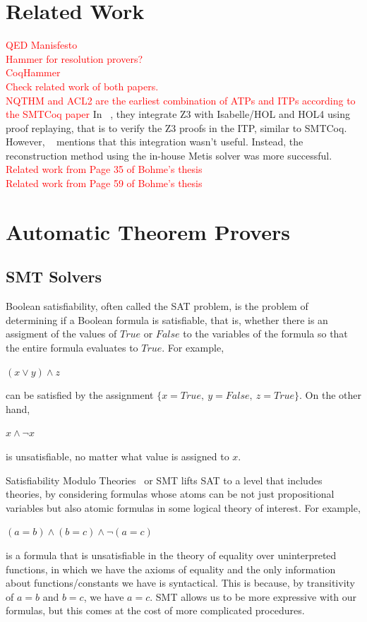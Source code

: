 \documentclass{article}
\begin{document}
\section{Related Work}
\label{sec:rel}
	\textcolor{red}{QED Manisfesto}\\
	\textcolor{red}{Hammer for resolution provers?}\\
	\textcolor{red}{CoqHammer}\\
	\textcolor{red}{Check related work of both papers.}\\
	\textcolor{red}{NQTHM and ACL2 are the earliest combination of ATPs and ITPs according to the SMTCoq paper}
	In ~\cite{10.1007/978-3-642-14052-5_14}, they integrate 
	Z3 with Isabelle/HOL and HOL4 
	using proof replaying, that is to verify 
	the Z3 proofs in the ITP, similar to SMTCoq. However, 
	~\cite{10.1007/978-3-642-22438-6_11} mentions that this
	integration wasn't useful. Instead, the reconstruction 
	method using the in-house Metis solver was more 
	successful. \\
	\textcolor{red}{Related work from Page 35 of Bohme's thesis}\\
	\textcolor{red}{Related work from Page 59 of Bohme's thesis}\\
	
\section{Automatic Theorem Provers}
\label{sec:atp}	
\subsection{SMT Solvers}
\label{smt}
	Boolean satisfiability, often called the SAT problem, 
	is the problem of determining if a Boolean formula
	is satisfiable, that is, whether there is an 
	assigment of the values of $True$ or $False$ 
	to the variables of the formula so that the entire 
	formula evaluates to $True$.
	For example,
	\begin{center}$(x \lor y) \land z$ \end{center}
	can be satisfied by the 
	assignment $\{x=True,\ y=False,\ z=True\}$. On the other hand, 
	\begin{center} $x \land \neg x$ \end{center}
	is unsatisfiable, no matter what value is assigned to $x$.
	
	Satisfiability Modulo Theories~\cite{DBLP:reference/mc/BarrettT18} 
	or SMT lifts SAT to a level that includes theories,
	by considering formulas whose atoms can be not just propositional variables but also atomic formulas in 
	some logical theory of interest.
	For example, 
	\begin{center} $(a = b) \land (b = c) \land \neg (a = c)$ 
	\end{center}
	is a formula that is unsatisfiable in the theory of 
	equality over uninterpreted functions, in which we have 
	the axioms of equality and the only information about
	functions/constants we have is syntactical. 
	This is because, by	transitivity of $a = b$ and $b = c$, 
	we have $a = c$. SMT 
	allows us to be more expressive with our formulas, 
	but this comes at the cost of more complicated 
	procedures.
	
\end{document}
